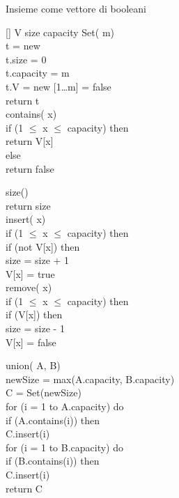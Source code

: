 \begin{code}{Insieme come vettore di booleani}
\begin{minipage}[t]{0.48\textwidth}
[] V\hfill{}
 size\hfill{}
 capacity\hfill{}
\nl\ind{} Set( m)\\
     t = new \\
    t.size = 0\\
    t.capacity = m\\
    t.V = new [1\dots m] = {false}\\
    return t\\

\ind{} contains( x)\\
    \indf if (1 $\leq$ x $\leq$ capacity) then\\
        return V[x]\\
    \indf else\\
        return false
\end{minipage}
\hfill
\begin{minipage}[t]{0.48\textwidth}
\ind{} size()\\
    return size\\

\ind insert( x)\\
    \indf if (1 $\leq$ x $\leq$ capacity) then\\
        \indff if (not V[x]) then\\
            size = size + 1\\
            V[x] = true\\

\ind remove( x)\\
\indf if (1 $\leq$ x $\leq$ capacity) then\\
    \indff if (V[x]) then\\
        size = size - 1\\
        V[x] = false
\end{minipage}
\newline\nl\ind{} union( A,  B)\\
     newSize = max(A.capacity, B.capacity)\\
     C = Set(newSize)\\
    \ind for (i = 1 to A.capacity) do\\
        \indf if (A.contains(i)) then\\
            \indff C.insert(i)\\
    \ind for (i = 1 to B.capacity) do\\
        \indf if (B.contains(i)) then\\
            \indff C.insert(i)\\
    \ind return C
\end{code}
